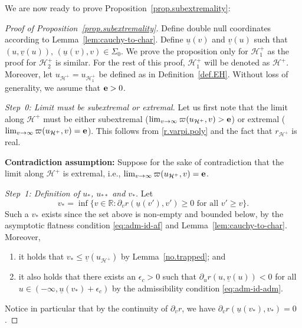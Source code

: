 \documentclass[10pt, reqno]{amsart}
\theoremstyle{definition}
\theoremstyle{remark}
\numberwithin{equation}{section}
\newcommand{\ep}{\epsilon}
\newcommand{\rd}{\partial}
\newcommand{\0}{\emptyset}
\newcommand{\bfe}{{\bf e}}
\newcommand{\calH}{\mathcal H}
\newcommand{\EH}{\calH^{+}}
\newcommand{\pfstep}[1]{\vspace{.5em} {\it \noindent #1.}}
\newcommand{\e}{\bfe}							%
\newcommand{\ub}{\underline{u}}
\begin{document}
We are now ready to prove Proposition~\ref{prop.subextremality}:
\begin{proof}[Proof of Proposition~\ref{prop.subextremality}]
Define double null coordinates according to Lemma~\ref{lem:cauchy-to-char}. Define $\underline{u}(v)$ and $\underline{v}(u)$ such that $(u,\underline{v}(u)),\,(\underline{u}(v),v)\in \Sigma_0$. We prove the proposition only for $\EH_1$ as the proof for $\EH_2$ is similar. For the rest of this proof, $\EH_1$ will be denoted as $\EH$. Moreover, let $u_{\EH}=u_{\EH_1}$ be defined as in Definition~\ref{def.EH}. Without loss of generality, we assume that $\e > 0$.

\pfstep{Step~0: Limit must be subextremal or extremal} Let us first note that the limit along $\EH$ must be either subextremal ($\lim_{v\to \infty}\varpi(u_{\EH},v)>{\bf e}$) or extremal ($\lim_{v\to \infty}\varpi(u_{\EH},v)={\bf e}$). This follows from \eqref{r.varpi.poly} and the fact that $r_{\EH}$ is real.

{\bf Contradiction assumption:} Suppose for the sake of contradiction that the limit along $\EH$ is extremal, i.e., $\lim_{v\to \infty}\varpi(u_{\mathcal H^+},v)={\bf e}$. 


\pfstep{Step~1: Definition of $u_*$, $u_{**}$ and $v_*$} Let 
$$v_*=\inf \{ v\in \mathbb R: \rd_v r (\underline{u}(v'),v')\geq 0 \mbox{ for all }v'\geq v\}.$$ 
Such a $v_*$ exists since the set above is non-empty and bounded below, by the asymptotic flatness condition \eqref{eq:adm-id-af} and Lemma~\ref{lem:cauchy-to-char}. Moreover, 
\begin{enumerate}
\item it holds that $v_*\leq \underline{v}(u_{\mathcal H^+})$ by Lemma~\ref{no.trapped}; and
\item it also holds that there exists an $\ep_c>0$ such that $\rd_u r (u, \underline{v}(u))<0$ for all $u \in (-\infty,\ub(v_*)+\ep_c)$ by the admissibility condition \eqref{eq:adm-id-adm}.
\end{enumerate}
Notice in particular that by the continuity of $\rd_v r$, we have $\rd_v r(\ub(v_*),v_*)=0$.


\end{proof}
\end{document}
